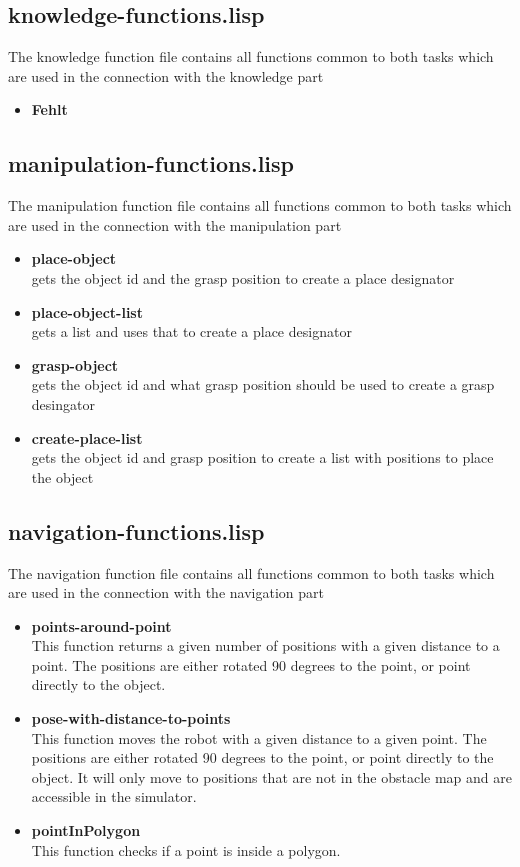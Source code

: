 \documentclass[main.tex]{subfiles}
\begin{document}
	    \subsection{knowledge-functions.lisp}
	    The knowledge function file contains all functions common to both tasks which are used in the connection with the knowledge part
	    \begin{itemize}
	    	\item \textbf{Fehlt} \\
	    \end{itemize}
	    \subsection{manipulation-functions.lisp}
	    The manipulation function file contains all functions common to both tasks which are used in the connection with the manipulation part
	    \begin{itemize}
	    \item \textbf{place-object} \\
	    gets the object id and the grasp position to create a place designator  
		\item \textbf{place-object-list} \\
		gets a list and uses that to create a place designator 
	    \item \textbf{grasp-object} \\
	    gets the object id and what grasp position should be used to create a grasp desingator
	    \item \textbf{create-place-list} \\
	    gets the object id and grasp position to create a list with positions to place the object
		\end{itemize}
	    \subsection{navigation-functions.lisp}
	    The navigation function file contains all functions common to both tasks which are used in the connection with the navigation part
	    \begin{itemize}
	    	\item \textbf{points-around-point} \\
	    	This function returns a given number of positions with a given 	distance to a point. The positions are either rotated 90 degrees to the point, or point directly to the object.
	    	\item \textbf{pose-with-distance-to-points} \\
	    	This function moves the robot with a given distance to a given point. The positions are either rotated 90 degrees to the point, or point directly to the object. It will only move to positions that are not in the obstacle map and are accessible in the simulator.
	    	\item \textbf{pointInPolygon} \\
This function checks if a point is inside a polygon.
	    \end{itemize}
\end{document}
